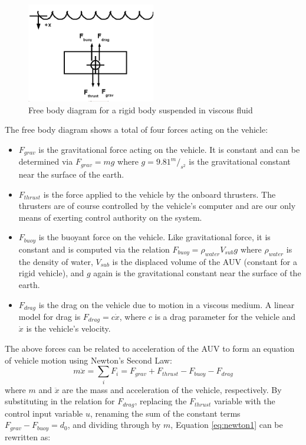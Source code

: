 \documentclass{article}
\begin{document}
\begin{figure}[h]
\includegraphics[width=0.5\textwidth]{freeBodyDiagram.png}
\centering
\caption{Free body diagram for a rigid body suspended in viscous fluid}
\label{fig:freeBody}
\end{figure}

The free body diagram shows a total of four forces acting on the vehicle: 
\begin{itemize}
\item $F_{grav}$ is the gravitational force acting on the vehicle.  It is constant and can be determined via $F_{grav}=mg$ where $g=9.81^m/_{s^2}$ is the gravitational constant near the surface of the earth.
\item $F_{thrust}$ is the force applied to the vehicle by the onboard thrusters.  The thrusters are of course controlled by the vehicle's computer and are our only means of exerting control authority on the system.
\item $F_{buoy}$ is the buoyant force on the vehicle.  Like gravitational force, it is constant and is computed via the relation $F_{buoy}=\rho_{water}V_{sub}g$ where $\rho_{water}$ is the density of water, $V_{sub}$ is the displaced volume of the AUV (constant for a rigid vehicle), and $g$ again is the gravitational constant near the surface of the earth.
\item $F_{drag}$ is the drag on the vehicle due to motion in a viscous medium.  A linear model for drag is $F_{drag}=c\dot{x}$, where $c$ is a drag parameter for the vehicle and $\dot{x}$ is the vehicle's velocity.  
\end{itemize}
The above forces can be related to acceleration of the AUV to form an equation of vehicle motion using Newton's Second Law:  
\begin{equation}
\label{eq:newton1}
m\ddot{x}=\sum_{i}F_i=F_{grav}+F_{thrust}-F_{buoy}-F_{drag}
\end{equation}
where $m$ and $\ddot{x}$ are the mass and acceleration of the vehicle, respectively.  By substituting in the relation for $F_{drag}$, replacing the $F_{thrust}$ variable with the control input variable $u$, renaming the sum of the constant terms $F_{grav}-F_{buoy}=d_0$, and dividing through by $m$, Equation \ref{eq:newton1} can be rewritten as:
\end{document}

